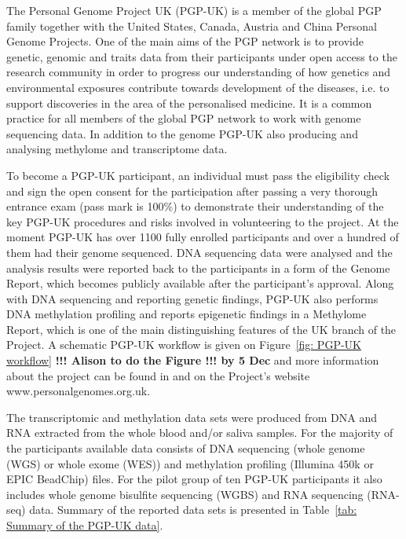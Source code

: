 \documentclass[english]{article}
\begin{document}
The Personal Genome Project UK (PGP-UK) is a member of the global PGP family together with the United States, Canada, Austria and China Personal Genome Projects. One of the main aims of the PGP network is to provide genetic, genomic and traits data from their participants under open access to the research community in order to progress our understanding of how genetics and environmental exposures contribute towards development of the diseases, i.e. to support discoveries in the area of the personalised medicine. It is a common practice for all members of the global PGP network to work with genome sequencing data. In addition to the genome PGP-UK also producing and analysing methylome and transcriptome data.

To become a PGP-UK participant, an individual must pass the eligibility check and sign the open consent for the participation after passing a very thorough entrance exam (pass mark is 100\%) to demonstrate their understanding of the key PGP-UK procedures and risks involved in volunteering to the project. At the moment PGP-UK has over 1100 fully enrolled participants and over a hundred of them had their genome sequenced. DNA sequencing data were analysed and the analysis results were reported back to the participants in a form of the Genome Report, which becomes publicly available after the participant's approval. Along with DNA sequencing and reporting genetic findings, PGP-UK also performs DNA methylation profiling and reports epigenetic findings in a Methylome Report, which is one of the main distinguishing features of the UK branch of the Project. A schematic PGP-UK workflow is given on Figure~\ref{fig: PGP-UK workflow} \textbf{!!! Alison to do the Figure !!! by 5 Dec} and more information about the project can be found in \cite{pgp10, pgpQA} and on the Project's website www.personalgenomes.org.uk.

The transcriptomic and methylation data sets were produced from DNA and RNA extracted from the whole blood and/or saliva samples. For the majority of the participants available data consists of DNA sequencing (whole genome (WGS) or whole exome (WES)) and methylation profiling (Illumina 450k or EPIC BeadChip) files. For the pilot group of ten PGP-UK participants \cite{pgp10} it also includes whole genome bisulfite sequencing (WGBS) and RNA sequencing (RNA-seq) data. Summary of the reported data sets is presented in Table~\ref{tab: Summary of the PGP-UK data}.
\end{document}
